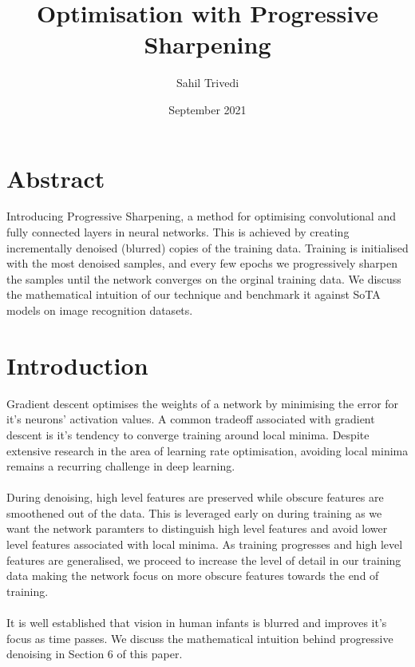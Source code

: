 \documentclass[12pt]{article}
\date{September 2021}
\title{Optimisation with Progressive Sharpening}
\author{Sahil Trivedi}
\begin{document}
	\maketitle
	
	\begin{multicols}{2}
		
		\section{Abstract}
		Introducing Progressive Sharpening, a method for optimising convolutional and fully connected layers in neural networks. This is achieved by creating incrementally denoised (blurred) copies of the training data. Training is initialised with the most denoised samples, and every few epochs we progressively sharpen the samples until the network converges on the orginal training data. We discuss the mathematical intuition of our technique and benchmark it against SoTA models on image recognition datasets. 
		
		\section{Introduction}
		Gradient descent optimises the weights of a network by minimising the error for it's neurons' activation values. A common tradeoff associated with gradient descent is it's tendency to converge training around local minima. Despite extensive research in the area of learning rate optimisation, avoiding local minima remains a recurring challenge in deep learning.
		\\\\
		During denoising, high level features are preserved while obscure features are smoothened out of the data. This is leveraged early on during training as we want the network paramters to distinguish high level features and avoid lower level features associated with local minima. As training progresses and high level features are generalised, we proceed to increase the level of detail in our training data making the network focus on more obscure features towards the end of training.
		\\\\
		It is well established that vision in human infants is blurred and improves it's focus as time passes. We discuss the mathematical intuition behind progressive denoising in Section 6 of this paper.  
		

\end{multicols}
\end{document}
